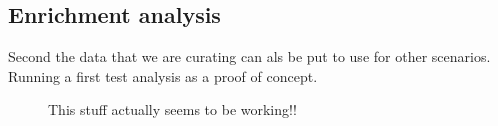     \subsection{Enrichment analysis}
    \label{subsec:result_enrichment}
    Second the data that we are curating can als be put to use for other scenarios. Running a first test analysis as a proof of concept. 

    \begin{figure}[htbp]
    \capstart
        \centering
    	

    	\begin{minipage}{\captionwidth}
    		\caption[enrichemtn]{ \newline This stuff actually seems to be working!!}
    		\label{fig:qPCR}
    	\end{minipage}
    \end{figure}
